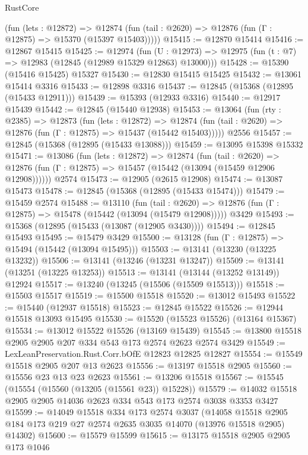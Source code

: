 \begin{lexlean}{RustCore}
\begin{coremodule}
      (fun (lets : @12872) =>
      @12874 (fun (tail : @2620) => @12876 (fun (Γ : @12875) => @15370 (@15397 @15403)))))
@15415 := @12870 @15414
@15416 := @12867 @15415
@15425 := @12974
    (fun (U : @12973) => @12975 (fun (t : @7) => @12983 (@12845 (@12989 @15329 @12863) @13000)))
@15428 := @15390 (@15416 @15425) @15327
@15430 := @12830 @15415 @15425
@15432 := @13061 @15414 @3316
@15433 := @12898 @3316
@15437 := @12845 (@15368 (@12895 (@15433 @12911)))
@15439 := @15393 (@12933 @3316)
@15440 := @12917 @15439
@15442 := @12845 (@15440 @12938)
@15453 := @13064
    (fun (rty : @2385) =>
    @12873
      (fun (lets : @12872) =>
      @12874 (fun (tail : @2620) => @12876 (fun (Γ : @12875) => @15437 (@15442 @15403)))))
    @2556
@15457 := @12845 (@15368 (@12895 (@15433 @13088)))
@15459 := @13095 @15398 @15332
@15471 := @13086
    (fun (lets : @12872) =>
    @12874
      (fun (tail : @2620) =>
      @12876 (fun (Γ : @12875) => @15457 (@15442 (@13094 (@15459 @12906 @12908))))))
    @2574
@15473 := @12905 (@2615 @12908)
@15474 := @13087 @15473
@15478 := @12845 (@15368 (@12895 (@15433 @15474)))
@15479 := @15459 @2574
@15488 := @13110
    (fun (tail : @2620) => @12876 (fun (Γ : @12875) => @15478 (@15442 (@13094 (@15479 @12908)))))
    @3429
@15493 := @15368 (@12895 (@15433 (@13087 (@12905 @3430))))
@15494 := @12845 @15493
@15495 := @15479 @3429
@15500 := @13128 (fun (Γ : @12875) => @15494 (@15442 (@13094 @15495)))
@15503 := @13141 (@13230 (@13225 @13232))
@15506 := @13141 (@13246 (@13231 @13247))
@15509 := @13141 (@13251 (@13225 @13253))
@15513 := @13141 (@13144 (@13252 @13149)) @12924
@15517 := @13240 (@13245 (@15506 (@15509 @15513)))
@15518 := @15503 @15517
@15519 := @15500 @15518
@15520 := @13012 @15493
@15522 := @15440 (@12937 @15518)
@15523 := @12845 @15522
@15526 := @12944 @15518 @13093 @15495
@15530 := @15520 (@15523 @15526) (@13164 @15367)
@15534 := @13012 @15522 @15526 (@13169 @15439)
@15545 := @13800 @15518 @2905 @2905 @207 @334 @543 @173 @2574 @2623 @2574 @3429
@15549 := LexLeanPreservation.Rust.Corr.bOfE @12823 @12825 @12827
@15554 := @15549 @15518 @2905 @207 @13 @2623
@15556 := @13197 @15518 @2905
@15560 := @15556 @23 @13 @23 @2623
@15561 := @13206 @15518
@15567 := @15545 (@15554 (@15560 (@13205 (@15561 @23)) @15228))
@15579 := @14032 @15518 @2905 @2905 @14036 @2623 @334 @543 @173 @2574 @3038 @3353 @3427
@15599 := @14049
    @15518
    @334
    @173
    @2574
    @3037
    (@14058 @15518 @2905 @184 @173 @219 @27 @2574 @2635 @3035 @14070 (@13976 @15518 @2905) @14302)
@15600 := @15579 @15599
@15615 := @13175
    @15518
    @2905
    @2905
    @173
    @1046

\end{coremodule}
\end{lexlean}
